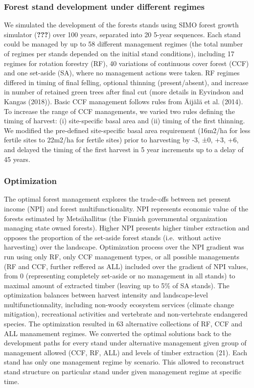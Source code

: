 \documentclass[]{elsarticle} %
\begin{document}
\subsubsection{Forest stand development under different
regimes}\label{forest-stand-development-under-different-regimes}

We simulated the development of the forests stands using SIMO forest
growth simulator ({\textbf{???}}) over 100 years, separated into 20
5-year sequences. Each stand could be managed by up to 58 different
management regimes (the total number of regimes per stands depended on
the initial stand conditions), including 17 regimes for rotation
forestry (RF), 40 variations of continuous cover forest (CCF) and one
set-aside (SA), where no management actions were taken. RF regimes
differed in timing of final felling, optional thinning (present/absent),
and increase in number of retained green trees after final cut (more
details in Eyvindson and Kangas (2018)). Basic CCF management follows
rules from Äijälä et al. (2014). To increase the range of CCF
managements, we varied two rules defining the timing of harvest: (i)
site-specific basal area and (ii) timing of the first thinning. We
modified the pre-defined site-specific basal area requirement (16m2/ha
for less fertile sites to 22m2/ha for fertile sites) prior to harvesting
by -3, ±0, +3, +6, and delayed the timing of the first harvest in 5 year
increments up to a delay of 45 years.

\subsubsection{Optimization}\label{optimization}

The optimal forest management explores the trade-offs between net
present income (NPI) and forest multifunctionality. NPI represents
economic value of the forests estimated by Metsähallitus (the Finnish
governmental organization managing state owned forests). Higher NPI
presents higher timber extraction and opposes the proportion of the
set-aside forest stands (i.e.~without active harvesting) over the
landscape. Optimization process over the NPI gradient was run using only
RF, only CCF management types, or all possible managements (RF and CCF,
further reffered as ALL) included over the gradient of NPI values, from
0 (representing completely set-aside or no management in all stands) to
maximal amount of extracted timber (leaving up to 5\% of SA stands). The
optimization balances between harvest intensity and landscape-level
multifunctionnality, including non-woody ecosystem services (climate
change mitigation), recreational activities and vertebrate and
non-vertebrate endangered species. The optimization resulted in 63
alternative collections of RF, CCF and ALL manamement regimes. We
converted the optimal solutions back to the development paths for every
stand under alternative management given group of management allowed
(CCF, RF, ALL) and levels of timber extraction (21). Each stand has only
one management regime by scenario. This allowed to reconstruct stand
structure on particular stand under given management regime at specific
time.
\end{document}
